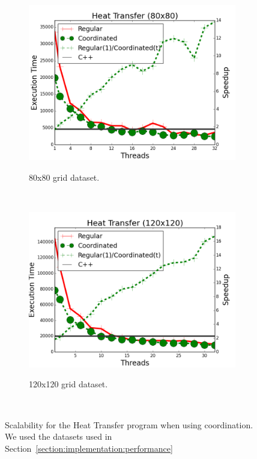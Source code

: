 \begin{figure}[]
        \centering
        \begin{subfigure}[b]{\plotsize\textwidth}
           \includegraphics[width=\textwidth]{experiments/coordination/cmp-new-heat-transfer-80.png}
           \label{fig:coordination:coord_ht_80}
           \caption{80x80 grid dataset.}
        \end{subfigure}
        ~
        \begin{subfigure}[b]{\plotsize\textwidth}
           \includegraphics[width=\textwidth]{experiments/coordination/cmp-new-heat-transfer-120.png}
           \label{fig:coordination:coord_ht_120}
           \caption{120x120 grid dataset.}
        \end{subfigure} \\
        \caption{Scalability for the Heat Transfer program when using
        coordination. We used the datasets used in
        Section~\ref{section:implementation:performance}}
        \label{fig:coordination:results_ht}
\end{figure}


